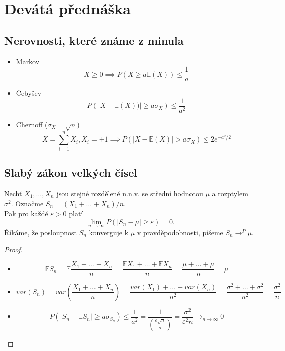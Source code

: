 \documentclass[../main.tex]{subfiles}
\begin{document}
\section{Devátá přednáška}

\subsection{Nerovnosti, které známe z minula}
\begin{itemize}
    \item Markov 
    \[X\geq 0 \implies P(X\geq a\mathbb{E}(X))\leq \frac{1}{a}\]
    \item Čebyšev
    \[P(|X-\mathbb{E}(X))|\geq a\sigma_X)\leq \frac{1}{a^2}\]
    \item Chernoff ($\sigma_X = \sqrt{n}$)
    \[X = \sum^n_{i=1}X_i,X_i = \pm 1 \implies P(|X-\mathbb{E}(X)|> a\sigma_X)\leq 2e^{-a^2/2}\]
\end{itemize}

\subsection{Slabý zákon velkých čísel}
\begin{theorem}
    Nechť $X_1,\dots ,X_n$ jsou stejné rozdělené n.n.v. se střední hodnotou $\mu$ a rozptylem $\sigma^2$.
    Označme $S_n = (X_1 + \dots + X_n)/n$.\\
    Pak pro každé $\varepsilon > 0$ platí
    \[\lim_{n\rightarrow \infty} P(|S_n - \mu | \geq \varepsilon) = 0.\]
    Říkáme, že posloupnost $S_n$ konverguje k $\mu$ v pravděpodobnosti, píšeme $S_n \rightarrow^P \mu$.
    \begin{proof}
        \begin{itemize}
            \item \[\mathbb{E}S_n = \mathbb{E}\frac{X_1 + \dots + X_n}{n} = \frac{\mathbb{E}X_1 + \dots + \mathbb{E}X_n}{n}
             = \frac{\mu + \dots + \mu}{n} = \mu\]
            \item \[var(S_n) = var \left(\frac{X_1 + \dots + X_n}{n}\right) = \frac{var(X_1) + \dots + var(X_n)}{n^2} 
            = \frac{\sigma^2 + \dots + \sigma^2}{n^2} = \frac{\sigma^2}{n}\]
            \item \[P(|S_n - \mathbb{E}S_n | \geq a\sigma_{S_n}) \leq \frac{1}{a^2} = \frac{1}{\left(\frac{\varepsilon \sqrt{n}}{\sigma}\right)} = \frac{\sigma^2}{\varepsilon^2 n} \rightarrow_{n\rightarrow \infty} 0\]
        \end{itemize}
    \end{proof}
\end{theorem}
\end{document}
